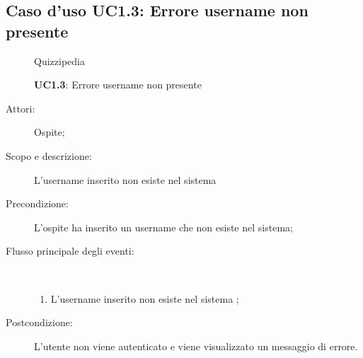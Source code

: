 \subsection{Caso d'uso UC1.3: Errore username non presente}
	\begin{figure}[H]
		\centering
		\begin{resizedtikzpicture}{\textwidth}
		\begin{umlsystem}[x=0, fill=lightgray!20]{Quizzipedia}
		\end{umlsystem}
		\end{resizedtikzpicture}
		\caption{\textbf{UC1.3}: Errore username non presente}
		\label{UC1.3}
	\end{figure}
\begin{description}
\item[Attori:] Ospite;
\item[Scopo e descrizione:] L'username inserito non esiste nel sistema
      \item[Precondizione:] L'ospite ha inserito un username che non esiste nel sistema;

        \item[Flusso principale degli eventi:] \ 
 \begin{enumerate}
          \item L'username inserito non esiste nel sistema
;

      \end{enumerate}
    \item[Postcondizione:] L'utente non viene autenticato e viene visualizzato un messaggio di errore.
  \end{description}
\hypertarget{UC1.4}{}
